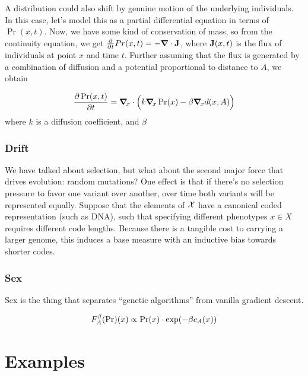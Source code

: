 \documentclass{article}
\begin{document}
A distribution could also shift by genuine motion of the underlying individuals.
In this case, let's model this as a partial differential equation in terms of $\Pr(x,t)$.
Now, we have some kind of conservation of mass, so from the continuity equation, we get
$\frac{\partial }{\partial t}Pr(x,t) = - \vgrad \cdot \mat J$,
where $\mat J(x,t)$ is the flux of individuals at point $x$ and time $t$.
Further assuming that the flux is generated by a combination of diffusion and a potential proportional to distance to $A$, we obtain

\[
    \frac{\partial \Pr(x, t)}{\partial t} = \vgrad_{\!x} \cdot \Big( k \vgrad_{\!x} \Pr (x) - \beta \vgrad_{\!x} d(x, A) \Big)
\]
where $k$ is a diffusion coefficient, and $\beta$



\subsubsection{Drift}
We have talked about selection, but what about the second major force that drives evolution: random mutations?
One effect is that if there's no selection pressure to favor one variant over another, over time both variants will be represented equally.
Suppose that the elements of $\X$ have a canonical coded representation (such as DNA), such that specifying different phenotypes $x \in X$ requires different code lengths.
Because there is a tangible cost to carrying a larger genome, this induces a base measure with an inductive bias towards shorter codes.

\subsubsection{Sex}
Sex is the thing that separates ``genetic algorithms'' from vanilla gradient descent.

\begin{align*}
    F^\beta_A(\Pr)(x) &\propto \Pr(x) \cdot \exp(-\beta \cost xA) \\
\end{align*}



\newpage%
\section{Examples}
\end{document}

